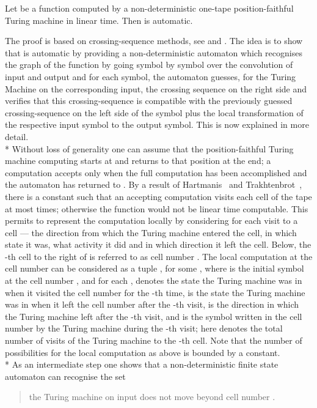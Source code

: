 \documentclass{LMCS}
\theoremstyle{plain}\newtheorem{athm}[thm]{Theorem}
\theoremstyle{plain}\newtheorem{aprop}[thm]{Proposition}
\theoremstyle{plain}\newtheorem{aprob}[thm]{Open Problem}
\theoremstyle{plain}\newtheorem{acor}[thm]{Corollary}
\theoremstyle{plain}\newtheorem{alem}[thm]{Lemma}
\theoremstyle{definition}\newtheorem{adefn}[thm]{Definition}
\theoremstyle{definition}\newtheorem{arem}[thm]{Remark}
\theoremstyle{plain}\newtheorem{aexmp}[thm]{Example}
\theoremstyle{plain}\newtheorem{aclm}[thm]{Claim}
\def\sp{\\*\indent}
\begin{document}
\begin{thm} \label{th:isautomatic}
Let  be a function computed by a non-deterministic one-tape
position-faithful Turing machine in linear time.
Then  is automatic.
\end{thm}

\proof
The proof is based on crossing-sequence methods, see \cite{He65,He65b}
and \cite[Section VIII.1]{Od99}. The idea is to show that  is automatic
by providing a non-deterministic automaton
which recognises the graph  of the function by going
symbol by symbol over the convolution of input and output and for each
symbol, the automaton guesses, for the Turing Machine on the corresponding
input, the crossing sequence on the right side
and verifies that this crossing-sequence is
compatible with the previously guessed crossing-sequence on the
left side of the symbol plus the local transformation of the respective
input symbol to the output symbol. This is now explained in more detail.
\sp
Without loss of generality one can assume that the position-faithful
Turing machine  computing  starts at 
and returns to that position at the end; a computation accepts only when the
full computation has been accomplished and the automaton has returned to
. By a result of Hartmanis~\cite{Ha68} and
Trakhtenbrot~\cite{Tr64}, there is a constant  such that an accepting
computation visits each cell of the tape at most  times; otherwise
the function  would not be linear time computable. This permits to
represent the computation locally by considering for each visit to a cell --- 
the direction from which the Turing machine  entered the cell, in which 
state it was, what activity it did and in which direction it left the cell. 
Below, the -th cell to the right of  is referred to as cell
number .
The local computation at the cell number 
can be considered as a tuple
, for some ,
where  is the initial symbol at the cell number , and for each ,
 denotes the state the Turing machine  was in
when it visited the cell number  for the -th time,
 is the state the Turing machine  was in when it 
left the cell number  after the -th visit,
 is the direction in which the 
Turing machine  left after the -th visit,
and  is the symbol written in the cell number  
by the Turing machine 
during the -th visit;
 here denotes the total number of visits of the Turing machine 
to the -th cell. Note that the number of possibilities for
the local computation as above is bounded by a constant.
\sp
As an intermediate step one shows that
a non-deterministic finite state automaton can recognise the set
\begin{quote}
  
  the Turing machine  on input 
  does not move beyond cell number .
\end{quote}
\end{document}
